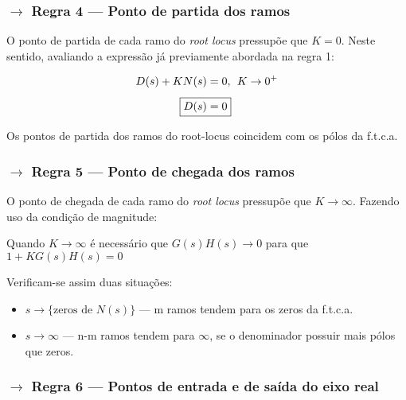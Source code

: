 \subsubsection[3.3.4 Regra 4 --- Ponto de partida dos ramos]{$\pmb{\rightarrow}$ Regra 4 --- Ponto de partida dos ramos}

\noindent O ponto de partida de cada ramo do \textit{root locus} pressupõe que $K = 0$. Neste sentido, avaliando a expressão já previamente abordada na regra 1:

$$
   \begin{aligned}
       D(s) + KN(s) &= 0,\;\, K \to 0^+\\[4pt]
       \Aboxed{D(s) &= 0}
   \end{aligned}
$$

\noindent Os pontos de partida dos ramos do root-locus coincidem com os pólos da f.t.c.a.

\subsubsection[3.3.5 Regra 5 --- Ponto de chegada dos ramos]{$\pmb{\rightarrow}$ Regra 5 --- Ponto de chegada dos ramos}

\noindent O ponto de chegada de cada ramo do \textit{root locus} pressupõe que $K \to \infty$. Fazendo uso da condição de magnitude:

{

\begin{mdframed}
    \noindent Quando $K \to \infty$ é necessário que $G(s)H(s) \to 0$ para que $1 + KG(s)H(s) = 0$
\end{mdframed}
}

\noindent Verificam-se assim duas situações:
\begin{itemize}
    \item $s \to \{\text{zeros de } N(s)\}$ --- m ramos tendem para os zeros da f.t.c.a.
    \item $s \to \infty$ --- n-m ramos tendem para $\infty$, se o denominador possuir mais pólos que zeros.
\end{itemize}

\subsubsection[3.3.6 Regra 6 --- Pontos de entrada e de saída do eixo real]{$\pmb{\rightarrow}$ Regra 6 --- Pontos de entrada e de saída do eixo real}

